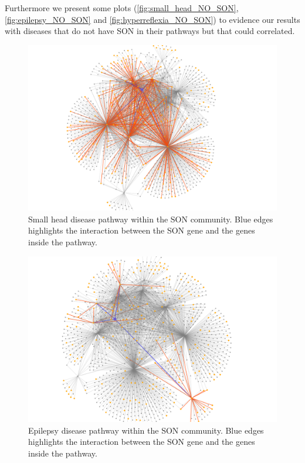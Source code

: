 Furthermore we present some plots (\autoref{fig:small_head_NO_SON}, \autoref{fig:epilepsy_NO_SON} and \autoref{fig:hyperreflexia_NO_SON}) to evidence our results with diseases that do not have SON in their pathways but that could correlated.
\begin{figure}[H]
    \centering
    \includegraphics[width=0.8\linewidth]{images/plots/small_head_NO_SON.png}
    \caption{Small head disease pathway within the SON community. Blue edges highlights the interaction between the SON gene and the genes inside the pathway.}
    \label{fig:small_head_NO_SON}
\end{figure}

\begin{figure}[H]
    \centering
    \includegraphics[width=0.8\linewidth]{images/plots/epilepsy_NO_SON.png}
    \caption{Epilepsy disease pathway within the SON community. Blue edges highlights the interaction between the SON gene and the genes inside the pathway.}
    \label{fig:epilepsy_NO_SON}
\end{figure}

